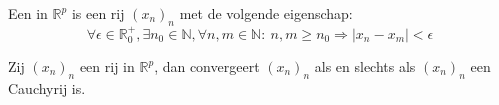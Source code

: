 \documentclass[main.tex]{subfiles}
\begin{document}
\begin{de}
  Een  in $\mathbb{R}^{p}$ is een rij $(x_{n})_{n}$ met de volgende eigenschap:
  \[ \forall \epsilon \in \mathbb{R}_{0}^{+}, \exists n_{0}\in \mathbb{N}, \forall n,m \in \mathbb{N}:\ n,m \ge n_{0} \Rightarrow |x_{n}-x_{m}| < \epsilon \]
\end{de}

\begin{st}
  Zij $(x_{n})_{n}$ een rij in $\mathbb{R}^{p}$, dan convergeert $(x_{n})_{n}$ als en slechts als $(x_{n})_{n}$ een Cauchyrij is.
\end{st}


\end{document}
